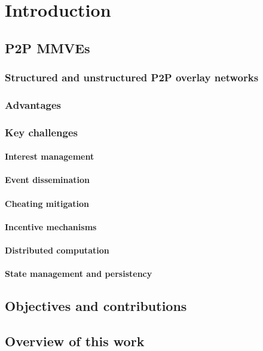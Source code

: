 \chapter{Introduction}
\label{chp:INTRO}


\section{P2P MMVEs}
\label{background}

\subsection{Structured and unstructured P2P overlay networks}

\subsection{Advantages}

\subsection{Key challenges}

\subsubsection{Interest management}
\subsubsection{Event dissemination}
\subsubsection{Cheating mitigation}
\subsubsection{Incentive mechanisms}
\subsubsection{Distributed computation}
\subsubsection{State management and persistency}

\section{Objectives and contributions}
\label{objectives}


\section{Overview of this work}
\label{overview_intro}
